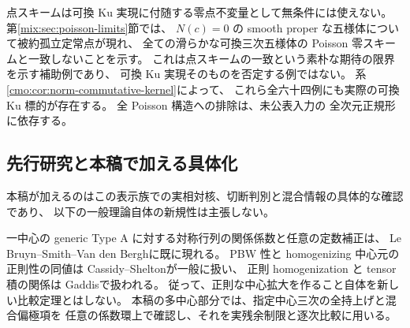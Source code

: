 点スキームは可換 Ku 実現に付随する零点不変量として無条件には使えない。
第\ref{mix:sec:poisson-limits}節では、
$N(c)=0$ の smooth proper な五様体について被約孤立定常点が現れ、
全ての滑らかな可換三次五様体の Poisson 零スキームと一致しないことを示す。
これは点スキームの一致という素朴な期待の限界を示す補助例であり、
可換 Ku 実現そのものを否定する例ではない。
系\ref{cmo:cor:norm-commutative-kernel}によって、
これら全六十四例にも実際の可換 Ku 標的が存在する。
全 Poisson 構造への排除は、未公表入力\cite{NCCubicA}の
全次元正規形に依存する。

\subsection{先行研究と本稿で加える具体化}

本稿が加えるのはこの表示族での実相対核、切断判別と混合情報の具体的な確認であり、
以下の一般理論自体の新規性は主張しない。

一中心の generic Type A に対する対称行列の関係係数と任意の定数補正は、
Le Bruyn--Smith--Van den Bergh\cite[Theorem~3.2.6, Type~A]{LBSV}に既に現れる。
PBW 性と homogenizing 中心元の正則性の同値は
Cassidy--Shelton\cite[Theorems~1.3, 1.5]{CMOCassidySheltonPBW}が一般に扱い、
正則 homogenization と tensor 積の関係は
Gaddis\cite[Propositions~2.7, 5.1]{CMOGaddisPBW}で扱われる。
従って、正則な中心拡大を作ること自体を新しい比較定理とはしない。
本稿の多中心部分では、指定中心三次の全持上げと混合偏極項を
任意の係数環上で確認し、それを実残余制限と逐次比較に用いる。

